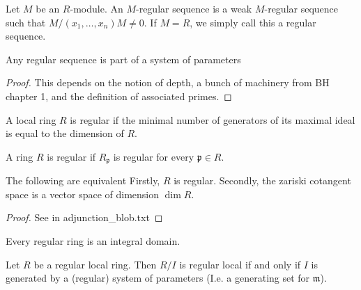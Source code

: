 \begin{definition}
  \label{def:reg_seq}
  Let $M$ be an $R$-module.
  An $M$-regular sequence is a weak $M$-regular sequence
  such that $M / (x_1, \ldots, x_n) M \neq 0$.
  If $M = R$, we simply call this a regular sequence.
\end{definition}

\begin{theorem}
  \label{thm:reg_seq_part_of_sys_param}
  Any regular sequence is part of a system of parameters
\end{theorem}

\begin{proof}
  This depends on the notion of depth, a bunch of machinery
  from BH chapter 1, and the definition of associated primes.
\end{proof}

\begin{definition}
  \label{def:reg_loc}
  A local ring $R$ is regular if 
  the minimal number of generators of its
  maximal ideal is equal to the dimension of $R$.
\end{definition}

\begin{definition}
  \label{def:reg_ring}
  A ring $R$ is regular if 
  $R_\mathfrak{p}$ is regular
  for every $\mathfrak{p} \in R$.
\end{definition}

\begin{proposition}
  \label{prop:reg_def_equiv}
  The following are equivalent
  Firstly, $R$ is regular.
  Secondly, the zariski cotangent space
  is a vector space of dimension $\dim R$.
\end{proposition}

\begin{proof}
  See in adjunction_blob.txt
\end{proof}

\begin{lemma}
  \label{lem:reg_int_dom}
  Every regular ring is an integral domain.
\end{lemma}

\begin{proposition}[BH 2.2.4]
  \label{prop:reg_quot_sys_param}
  Let $R$ be a regular local ring. 
  Then $R / I$ is regular local if and only if 
  $I$ is generated by a (regular) system of parameters
  (I.e. a generating set for $\mathfrak{m}$).
\end{proposition}

